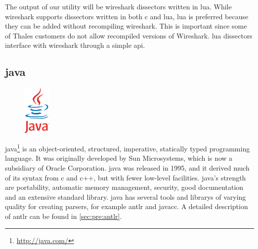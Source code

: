 The output of our \gls{utility} will be \Gls{wireshark} \glspl{dissector} written in \Gls{lua}. While
\Gls{wireshark} supports \glspl{dissector} written in both \Gls{c} and \Gls{lua}, \Gls{lua} is preferred
because they can be added without recompiling \Gls{wireshark}. This is important since some of Thales customers do not allow recompiled versions of Wireshark. \Gls{lua} \glspl{dissector}
interface with \Gls{wireshark} through a simple \Gls{api}.

\subsection{\Gls{java}}
\label{sec:pre:java}
\begin{figure}
	\vspace{-30pt}
	\includegraphics[width=1.3cm]{./planning/img/java_logo}
	\vspace{-30pt}
\end{figure}
\Gls{java}\footnote{\url{http://java.com/}} is an object-oriented, structured,
imperative, statically typed programming language. It was originally developed
by Sun Microsystems, which is now a subsidiary of Oracle Corporation. \Gls{java} was
released in 1995, and it derived much of its syntax from \Gls{c} and \Gls{c++}, but with
fewer low-level facilities. \Gls{java}’s strength are portability, automatic memory
management, security, good documentation and an extensive standard \gls{library}.\cite{JavaCOM}
\Gls{java} has several tools and \glspl{library} of varying quality for creating \glspl{parser},
for example \gls{antlr} and \gls{javacc}. A detailed description of \gls{antlr} can be found in 
\autoref{sec:pre:antlr}.

